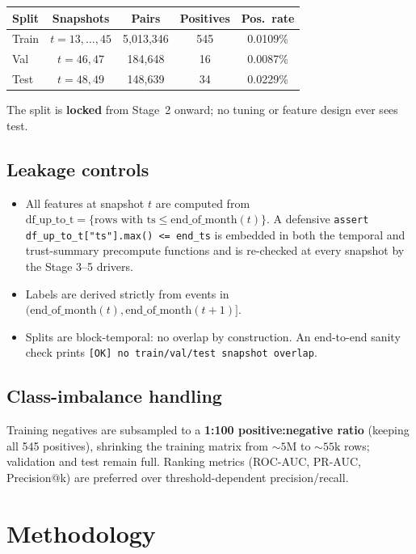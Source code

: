 \documentclass[11pt,a4paper]{article}
\newcommand{\code}[1]{\texttt{#1}}
\begin{document}
\begin{center}
\begin{tabular}{lcccc}
\toprule
Split & Snapshots        & Pairs       & Positives & Pos.\ rate \\
\midrule
Train & $t = 13,\dots,45$ & 5{,}013{,}346 & 545 & 0.0109\% \\
Val   & $t = 46, 47$      &   184{,}648 &  16 & 0.0087\% \\
Test  & $t = 48, 49$      &   148{,}639 &  34 & 0.0229\% \\
\bottomrule
\end{tabular}
\end{center}
The split is \textbf{locked} from Stage~2 onward; no tuning or feature design
ever sees test.

\subsection{Leakage controls}
\begin{itemize}[nosep]
  \item All features at snapshot $t$ are computed from
        $\mathrm{df\_up\_to\_t} = \{\text{rows with }
        \mathrm{ts} \leq \mathrm{end\_of\_month}(t)\}$. A defensive
        \code{assert df\_up\_to\_t["ts"].max() <= end\_ts} is embedded in
        both the temporal and trust-summary precompute functions and is
        re-checked at every snapshot by the Stage 3--5 drivers.
  \item Labels are derived strictly from events in
        $(\mathrm{end\_of\_month}(t), \mathrm{end\_of\_month}(t{+}1)]$.
  \item Splits are block-temporal: no overlap by construction. An
        end-to-end sanity check prints
        \code{[OK] no train/val/test snapshot overlap}.
\end{itemize}

\subsection{Class-imbalance handling}
Training negatives are subsampled to a \textbf{1:100 positive:negative ratio}
(keeping all 545 positives), shrinking the training matrix from ${\sim}5\mathrm{M}$
to ${\sim}55\mathrm{k}$ rows; validation and test remain full. Ranking metrics
(ROC-AUC, PR-AUC, Precision@k) are preferred over threshold-dependent
precision/recall.

\section{Methodology}
\end{document}
